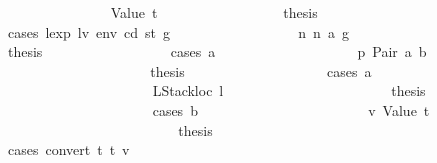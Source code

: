 \begin{isabellebody}
\ \ \ \ \ \ \ \ \ \ \ \ \ \ \isamarkupfalse%
\ {\isacharparenleft}{\kern0pt}Value\ t{\isacharparenright}{\kern0pt}\isanewline
\ \ \ \ \ \ \ \ \ \ \ \ \ \ \isamarkupfalse%
\ \isamarkupfalse%
\ {\isacharquery}{\kern0pt}thesis\isanewline
\ \ \ \ \ \ \ \ \ \ \ \ \ \ \isamarkupfalse%
\ {\isacharparenleft}{\kern0pt}cases\ {\isachardoublequoteopen}lexp\ lv\ env\ cd\ st{\isacharprime}{\kern0pt}{\isacharprime}{\kern0pt}\ g{\isacharprime}{\kern0pt}{\isachardoublequoteclose}{\isacharparenright}{\kern0pt}\isanewline
\ \ \ \ \ \ \ \ \ \ \ \ \ \ \ \ \isamarkupfalse%
\ n{}{\isacharcolon}{\kern0pt}\ {\isacharparenleft}{\kern0pt}n\ a\ g{\isacharprime}{\kern0pt}{\isacharprime}{\kern0pt}{\isacharparenright}{\kern0pt}\isanewline
\ \ \ \ \ \ \ \ \ \ \ \ \ \ \ \ \isamarkupfalse%
\ \isamarkupfalse%
\ {\isacharquery}{\kern0pt}thesis\isanewline
\ \ \ \ \ \ \ \ \ \ \ \ \ \ \ \ \isamarkupfalse%
\ {\isacharparenleft}{\kern0pt}cases\ a{\isacharparenright}{\kern0pt}\isanewline
\ \ \ \ \ \ \ \ \ \ \ \ \ \ \ \ \ \ \isamarkupfalse%
\ p{}{\isacharcolon}{\kern0pt}\ {\isacharparenleft}{\kern0pt}Pair\ a\ b{\isacharparenright}{\kern0pt}\isanewline
\ \ \ \ \ \ \ \ \ \ \ \ \ \ \ \ \ \ \isamarkupfalse%
\ \isamarkupfalse%
\ {\isacharquery}{\kern0pt}thesis\isanewline
\ \ \ \ \ \ \ \ \ \ \ \ \ \ \ \ \ \ \isamarkupfalse%
\ {\isacharparenleft}{\kern0pt}cases\ a{\isacharparenright}{\kern0pt}\isanewline
\ \ \ \ \ \ \ \ \ \ \ \ \ \ \ \ \ \ \ \ \isamarkupfalse%
\ {\isacharparenleft}{\kern0pt}LStackloc\ l{\isacharparenright}{\kern0pt}\isanewline
\ \ \ \ \ \ \ \ \ \ \ \ \ \ \ \ \ \ \ \ \isamarkupfalse%
\ \isamarkupfalse%
\ {\isacharquery}{\kern0pt}thesis\isanewline
\ \ \ \ \ \ \ \ \ \ \ \ \ \ \ \ \ \ \ \ \isamarkupfalse%
\ {\isacharparenleft}{\kern0pt}cases\ b{\isacharparenright}{\kern0pt}\isanewline
\ \ \ \ \ \ \ \ \ \ \ \ \ \ \ \ \ \ \ \ \ \ \isamarkupfalse%
\ v{}{\isacharcolon}{\kern0pt}\ {\isacharparenleft}{\kern0pt}Value\ t{\isacharprime}{\kern0pt}{\isacharparenright}{\kern0pt}\isanewline
\ \ \ \ \ \ \ \ \ \ \ \ \ \ \ \ \ \ \ \ \ \ \isamarkupfalse%
\ \isamarkupfalse%
\ {\isacharquery}{\kern0pt}thesis\isanewline
\ \ \ \ \ \ \ \ \ \ \ \ \ \ \ \ \ \ \ \ \ \ \isamarkupfalse%
\ {\isacharparenleft}{\kern0pt}cases\ {\isachardoublequoteopen}convert\ t\ t{\isacharprime}{\kern0pt}\ v\ {\isachardoublequoteclose}{\isacharparenright}{\kern0pt}\isanewline

\end{isabellebody}
